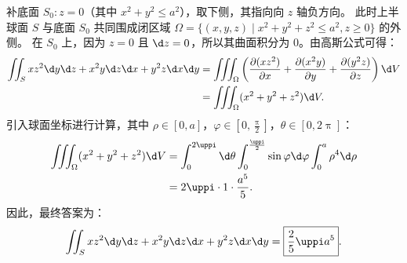 \begin{solution}
    补底面 $S_0: z = 0$（其中 $x^2 + y^2 \le a^2$），取下侧，其指向向 $z$ 轴负方向。
    此时上半球面 $S$ 与底面 $S_0$ 共同围成闭区域 $\Omega = \{ (x, y, z) \mid x^2 + y^2 + z^2 \le a^2, z \ge 0 \}$ 的外侧。
    在 $S_0$ 上，因为 $z = 0$ 且 $\d z = 0$，所以其曲面积分为 $0$。由高斯公式可得：
    \begin{equation}
        \label{eq:ball-half-1}
        \begin{aligned}
            \iint_{S} x z^2 \d y \d z + x^2 y \d z \d x + y^2 z \d x \d y & = \iiint_{\Omega} \left( \frac{\partial(x z^2)}{\partial x} + \frac{\partial(x^2 y)}{\partial y} + \frac{\partial(y^2 z)}{\partial z} \right) \d V \\
                                                                          & = \iiint_{\Omega} (x^2 + y^2 + z^2) \d V.
        \end{aligned}
    \end{equation}
    引入球面坐标进行计算，其中 $\rho \in [0, a]$，$\varphi \in \left[ 0, \frac{\uppi}{2} \right]$，$\theta \in [0, 2\uppi]$：
    \begin{equation}
        \label{eq:ball-half-2}
        \begin{aligned}
            \iiint_{\Omega} (x^2 + y^2 + z^2) \d V & = \int_0^{2\uppi} \d \theta \int_0^{\frac{\uppi}{2}} \sin \varphi \d \varphi \int_0^a \rho^4 \d \rho \\
                                                   & = 2 \uppi \cdot 1 \cdot \frac{a^5}{5}.
        \end{aligned}
    \end{equation}
    因此，最终答案为：
    \begin{equation}
        \label{eq:ball-half-3}
        \iint_{S} x z^2 \d y \d z + x^2 y \d z \d x + y^2 z \d x \d y = \boxed{\frac{2}{5} \uppi a^5}.
    \end{equation}



\end{solution}
